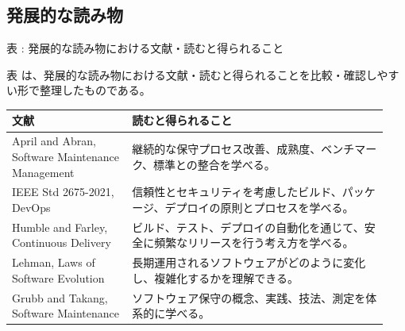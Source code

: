 \subsection{発展的な読み物}
\par\smallskip\noindent{}\label{tab:ch07-16}表 \thetable: 発展的な読み物における文献・読むと得られること\par\smallskip
表 \thetable は、発展的な読み物における文献・読むと得られることを比較・確認しやすい形で整理したものである。\par\smallskip
\begin{longtable}{p{0.30\linewidth}p{0.64\linewidth}}
\toprule
文献 & 読むと得られること \\
\midrule
\endhead
April and Abran, Software Maintenance Management & 継続的な保守プロセス改善、成熟度、ベンチマーク、標準との整合を学べる。 \\
IEEE Std 2675-2021, DevOps & 信頼性とセキュリティを考慮したビルド、パッケージ、デプロイの原則とプロセスを学べる。 \\
Humble and Farley, Continuous Delivery & ビルド、テスト、デプロイの自動化を通じて、安全に頻繁なリリースを行う考え方を学べる。 \\
Lehman, Laws of Software Evolution & 長期運用されるソフトウェアがどのように変化し、複雑化するかを理解できる。 \\
Grubb and Takang, Software Maintenance & ソフトウェア保守の概念、実践、技法、測定を体系的に学べる。 \\
\bottomrule
\end{longtable}
